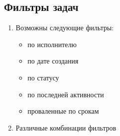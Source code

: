 \documentclass[14pt,a4paper]{extarticle}
\begin{document}
		
	\subsection {Фильтры задач}
	\begin{enumerate}
		\item  Возможны следующие фильтры:
		\begin{itemize}
			\item по исполнителю
			\item по дате создания
			\item по статусу
			\item по последней активности
			\item проваленные по срокам
		\end{itemize}
		
		\item Различные комбинации фильтров
	\end{enumerate}
	
%		
%		
%		
%		
%		 
	
\end{document}
